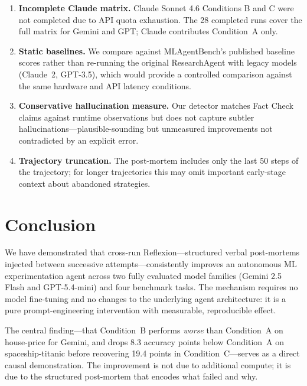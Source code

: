 \documentclass[conference]{IEEEtran}
\begin{document}
\begin{enumerate}
  \item \textbf{Incomplete Claude matrix.} Claude Sonnet 4.6 Conditions B and C
        were not completed due to API quota exhaustion. The 28 completed runs
        cover the full matrix for Gemini and GPT; Claude contributes Condition~A
        only.
  \item \textbf{Static baselines.} We compare against MLAgentBench's published
        baseline scores rather than re-running the original ResearchAgent with
        legacy models (Claude~2, GPT-3.5), which would provide a controlled
        comparison against the same hardware and API latency conditions.
  \item \textbf{Conservative hallucination measure.} Our detector matches
        Fact Check claims against runtime observations but does not capture
        subtler hallucinations---plausible-sounding but unmeasured improvements
        not contradicted by an explicit error.
  \item \textbf{Trajectory truncation.} The post-mortem includes only the last
        50 steps of the trajectory; for longer trajectories this may omit
        important early-stage context about abandoned strategies.
\end{enumerate}

\section{Conclusion}

We have demonstrated that cross-run Reflexion---structured verbal post-mortems
injected between successive attempts---consistently improves an autonomous ML
experimentation agent across two fully evaluated model families (Gemini 2.5
Flash and GPT-5.4-mini) and four benchmark tasks. The mechanism requires no
model fine-tuning and no changes to the underlying agent architecture: it is
a pure prompt-engineering intervention with measurable, reproducible effect.

The central finding---that Condition~B performs \emph{worse} than Condition~A
on house-price for Gemini, and drops 8.3 accuracy points below Condition~A on
spaceship-titanic before recovering 19.4 points in Condition~C---serves as a
direct causal demonstration. The improvement is not due to additional compute;
it is due to the structured post-mortem that encodes what failed and why.
\end{document}
